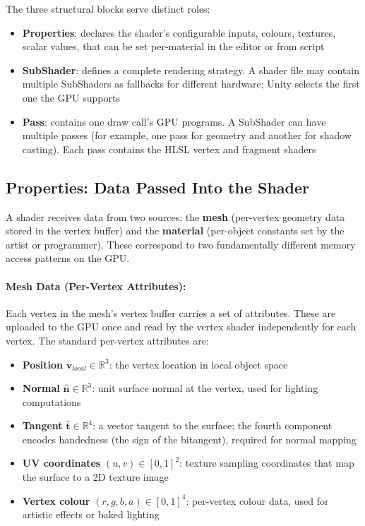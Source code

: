 \documentclass[11pt]{article}
\begin{document}
The three structural blocks serve distinct roles:

\begin{itemize}
    \item \textbf{Properties}: declares the shader's configurable inputs, colours, textures, scalar values, that can be set per-material in the editor or from script
    \item \textbf{SubShader}: defines a complete rendering strategy. A shader file may contain multiple SubShaders as fallbacks for different hardware; Unity selects the first one the GPU supports
    \item \textbf{Pass}: contains one draw call's GPU programs. A SubShader can have multiple passes (for example, one pass for geometry and another for shadow casting). Each pass contains the HLSL vertex and fragment shaders
\end{itemize}


\subsection{Properties: Data Passed Into the Shader}

A shader receives data from two sources: the \textbf{mesh} (per-vertex geometry data stored in the vertex buffer) and the \textbf{material} (per-object constants set by the artist or programmer). These correspond to two fundamentally different memory access patterns on the GPU.

\paragraph{Mesh Data (Per-Vertex Attributes):}

Each vertex in the mesh's vertex buffer carries a set of attributes. These are uploaded to the GPU once and read by the vertex shader independently for each vertex. The standard per-vertex attributes are:

\begin{itemize}
    \item \textbf{Position} $\mathbf{v}_{local} \in \mathbb{R}^3$: the vertex location in local object space
    \item \textbf{Normal} $\hat{\mathbf{n}} \in \mathbb{R}^3$: unit surface normal at the vertex, used for lighting computations
    \item \textbf{Tangent} $\hat{\mathbf{t}} \in \mathbb{R}^4$: a vector tangent to the surface; the fourth component encodes handedness (the sign of the bitangent), required for normal mapping
    \item \textbf{UV coordinates} $(u, v) \in [0,1]^2$: texture sampling coordinates that map the surface to a 2D texture image
    \item \textbf{Vertex colour} $(r, g, b, a) \in [0,1]^4$: per-vertex colour data, used for artistic effects or baked lighting
\end{itemize}
\end{document}
